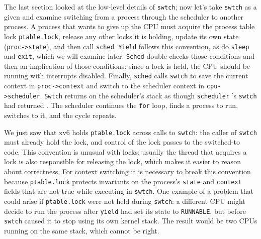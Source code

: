 The last section looked at the low-level details of
\lstinline{swtch};
now let's take 
\lstinline{swtch}
as a given and examine 
switching from a process through the scheduler to another process.
A process
that wants to give up the CPU must
acquire the process table lock
\lstinline{ptable.lock},
release any other locks it is holding,
update its own state
(\lstinline{proc->state}),
and then call
\lstinline{sched}.
\lstinline{Yield}
follows this convention, as do
\lstinline{sleep}
and
\lstinline{exit},
which we will examine later.
\lstinline{Sched}
double-checks those conditions
and then an implication of those conditions:
since a lock is held, the CPU should be
running with interrupts disabled.
Finally,
\lstinline{sched}
calls
\lstinline{swtch}
to save the current context in 
\lstinline{proc->context}
and switch to the scheduler context in
\lstinline{cpu->scheduler}.
\lstinline{Swtch}
returns on the scheduler's stack
as though
\lstinline{scheduler} 's
\lstinline{swtch}
had returned
.
The scheduler continues the 
\lstinline{for}
loop, finds a process to run, 
switches to it, and the cycle repeats.

We just saw that xv6 holds
\lstinline{ptable.lock}
across calls to
\lstinline{swtch}:
the caller of
\lstinline{swtch}
must already hold the lock, and control of the lock passes to the
switched-to code.  This convention is unusual with locks; usually
the thread that acquires a lock is also responsible for
releasing the lock, which makes it easier to reason about correctness.
For context switching it is necessary to break this convention because
\lstinline{ptable.lock}
protects invariants on the process's
\lstinline{state}
and
\lstinline{context}
fields that are not true while executing in
\lstinline{swtch}.
One example of a problem that could arise if
\lstinline{ptable.lock}
were not held during
\lstinline{swtch}:
a different CPU might decide
to run the process after 
\lstinline{yield}
had set its state to
\lstinline{RUNNABLE},
but before 
\lstinline{swtch}
caused it to stop using its own kernel stack.
The result would be two CPUs running on the same stack,
which cannot be right.


